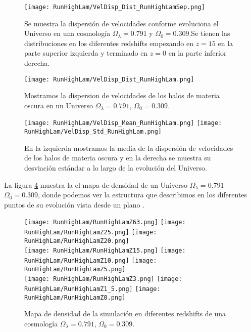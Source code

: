 \begin{figure}[H]
    \centering
    \texttt{[image: RunHighLam/VelDisp\_Dist\_RunHighLamSep.png]}
    \caption[Dispersión de velocidades]{\footnotesize Se muestra la dispersión de velocidades conforme evoluciona el Universo en una cosmología $\Omega_\lambda = 0.791$ y $\Omega_0 = 0.309$.Se tienen las distribuciones en los diferentes redshifts empezando en $z=15$ en la parte superior izquierda y terminado en $z=0$ en la parte inferior derecha.}
    \label{fig:HighLam-VelDispDistSep}
\end{figure}

\begin{figure}[H]
    \centering
    \texttt{[image: RunHighLam/VelDisp\_Dist\_RunHighLam.png]}
    \caption[Distribución de la dispersión de velocidades]{\footnotesize Mostramos la dispersion de velocidades de los halos de materia oscura en un Universo $\Omega_\lambda = 0.791$, $\Omega_0 = 0.309$.}
    \label{fig:HighLam-VelDispDist}
\end{figure}

\begin{figure}[H]
    \centering
    \texttt{[image: RunHighLam/VelDisp\_Mean\_RunHighLam.png]}
    \texttt{[image: RunHighLam/VelDisp\_Std\_RunHighLam.png]}
    \caption[Media y desviación estándar de la dispersión de velocidades]{\footnotesize En la izquierda mostramos la media de la dispersión de velocidades de los halos de materia oscura y en la derecha se muestra su desviación estándar a lo largo de la evolución del Universo.}
    \label{fig:HighLam-VelDispStats}
\end{figure}

La figura \ref{fig:HighLam-DensityMap} muestra la el mapa de densidad de un Universo $\Omega_\lambda = 0.791$ $\Omega_0 = 0.309$, donde podemos ver la estructura que describimos  en los diferentes puntos de su evolución vista desde un plano .
\begin{figure}[H]
    \centering

    \texttt{[image: RunHighLam/RunHighLamZ63.png]}   %
    \texttt{[image: RunHighLam/RunHighLamZ25.png]}   %
    \texttt{[image: RunHighLam/RunHighLamZ20.png]}   %
    \\
    \texttt{[image: RunHighLam/RunHighLamZ15.png]}   %
    \texttt{[image: RunHighLam/RunHighLamZ10.png]}   %
    \texttt{[image: RunHighLam/RunHighLamZ5.png]}    %
    \\
    \texttt{[image: RunHighLam/RunHighLamZ3.png]}    %
    \texttt{[image: RunHighLam/RunHighLamZ1\_5.png]}  %
    \texttt{[image: RunHighLam/RunHighLamZ0.png]}    %
    \caption[Mapa de densidad en en diferentes redshift]{ \footnotesize Mapa de densidad de la simulación en diferentes redshifts de una cosmología $\Omega_\lambda = 0.791$, $\Omega_0 = 0.309$. }
    \label{fig:HighLam-DensityMap}
\end{figure}
